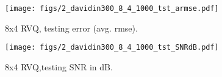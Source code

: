 								\begin{figure}[h!]
								\centering
								\texttt{[image: figs/2\_davidin300\_8\_4\_1000\_tst\_armse.pdf]}
								\caption{8x4 RVQ, testing error (avg. rmse).}
								\label{fig:2_davidin300_8_4_1000_tst_armse}
								\end{figure}

								\begin{figure}[h!]
								\centering
								\texttt{[image: figs/2\_davidin300\_8\_4\_1000\_tst\_SNRdB.pdf]}
								\caption{8x4 RVQ,testing SNR in dB.}
								\label{fig:2_davidin300_8_4_1000_tst_SNRdB}
								\end{figure}
